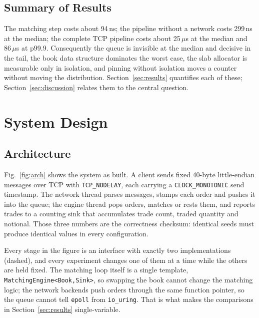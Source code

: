 \documentclass[conference]{IEEEtran}
\newcommand{\us}{\,$\mu$s}
\newcommand{\ns}{\,ns}
\begin{document}
\subsection{Summary of Results}
The matching step costs about 94\ns; the pipeline without a network costs
299\ns{} at the median; the complete TCP pipeline costs about 25\us{} at the
median and 86\us{} at p99.9. Consequently the queue is invisible at the median
and decisive in the tail, the book data structure dominates the worst case, the
slab allocator is measurable only in isolation, and pinning without isolation
moves a counter without moving the distribution. Section~\ref{sec:results}
quantifies each of these; Section~\ref{sec:discussion} relates them to the
central question.

\section{System Design}
\label{sec:design}

\subsection{Architecture}
Fig.~\ref{fig:arch} shows the system as built. A client sends fixed 40-byte
little-endian messages over TCP with \texttt{TCP\_NODELAY}, each carrying a
\texttt{CLOCK\_MONOTONIC} send timestamp. The network thread parses messages,
stamps each order and pushes it into the queue; the engine thread pops orders,
matches or rests them, and reports trades to a counting sink that accumulates
trade count, traded quantity and notional. Those three numbers are the
correctness checksum: identical seeds must produce identical values in every
configuration.

Every stage in the figure is an interface with exactly two implementations
(dashed), and every experiment changes one of them at a time while the others
are held fixed. The matching loop itself is a single template,
\texttt{MatchingEngine<Book,Sink>}, so swapping the book cannot change the
matching logic; the network backends push orders through the same function
pointer, so the queue cannot tell \texttt{epoll} from \texttt{io\_uring}. That
is what makes the comparisons in Section~\ref{sec:results} single-variable.
\end{document}
